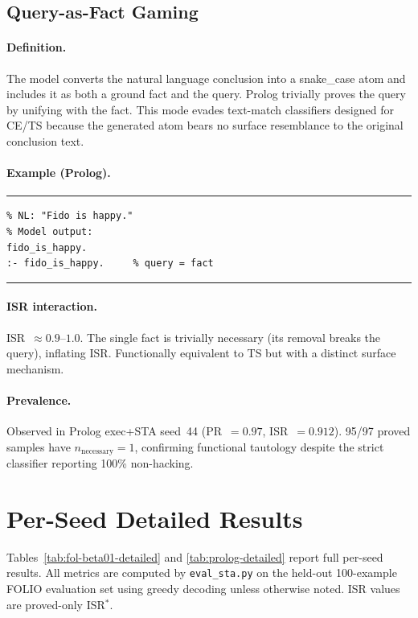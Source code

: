 \subsection{Query-as-Fact Gaming}

\paragraph{Definition.}
The model converts the natural language conclusion into a snake\_case atom and includes it as both a ground fact and the query.
Prolog trivially proves the query by unifying with the fact.
This mode evades text-match classifiers designed for CE/TS because the generated atom bears no surface resemblance to the original conclusion text.

\paragraph{Example (Prolog).}
\smallskip\noindent\rule{\columnwidth}{0.3pt}
\begin{verbatim}
% NL: "Fido is happy."
% Model output:
fido_is_happy.
:- fido_is_happy.     % query = fact
\end{verbatim}
\noindent\rule{\columnwidth}{0.3pt}\smallskip

\paragraph{ISR interaction.}
ISR~$\approx 0.9$--$1.0$.
The single fact is trivially necessary (its removal breaks the query), inflating ISR.
Functionally equivalent to TS but with a distinct surface mechanism.

\paragraph{Prevalence.}
Observed in Prolog exec+STA seed~44 (PR~$=0.97$, ISR~$=0.912$).
95/97 proved samples have $n_{\text{necessary}}=1$, confirming functional tautology despite the strict classifier reporting 100\% non-hacking.


\section{Per-Seed Detailed Results}
\label{app:detailed-results}

Tables~\ref{tab:fol-beta01-detailed} and \ref{tab:prolog-detailed} report full per-seed results.
All metrics are computed by \texttt{eval\_sta.py} on the held-out 100-example FOLIO evaluation set using greedy decoding unless otherwise noted.
ISR values are proved-only ISR$^*$.

